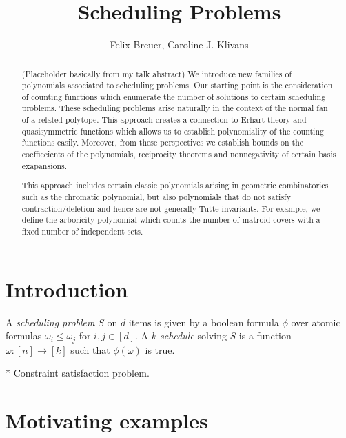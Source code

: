 \documentclass[12pt,reqno]{amsart}
\numberwithin{definition}{section}
\theoremstyle{definition}
\newcommand{\defn}[1]{\emph{#1}}
\begin{document}
\title{Scheduling Problems}
\author{Felix Breuer, Caroline J. Klivans}



\begin{abstract}{(Placeholder basically from my talk abstract) We introduce new families of polynomials associated to scheduling problems.  Our starting point is the consideration of counting functions which enumerate the number of solutions to certain scheduling problems.  These scheduling problems arise naturally in the context of the normal fan of a related polytope.  This approach creates a connection to Erhart theory and quasisymmetric functions which allows us to establish polynomiality of the counting functions easily. Moreover, from these perspectives we establish bounds on the coeffiecients of the polynomials, reciprocity theorems and nonnegativity of certain basis exapansions. 

This approach includes certain classic polynomials arising in geometric combinatorics such as the chromatic polynomial, but also polynomials that do not satisfy contraction/deletion and hence are not generally Tutte invariants.  For example, we define the arboricity polynomial which counts the number of matroid covers with a fixed number of independent sets.}
\end{abstract}
\maketitle


\tableofcontents

\section{Introduction}



A \defn{scheduling problem} $S$ on $d$ items is given by a boolean formula $\phi$ over atomic formulas $\omega_i\leq \omega_j$ for $i,j\in[d]$. A \defn{$k$-schedule} solving $S$ is a function $\omega:[n]\rightarrow[k]$ such that $\phi(\omega)$ is true.

* Constraint satisfaction problem.



\section{Motivating examples}

\end{document}
